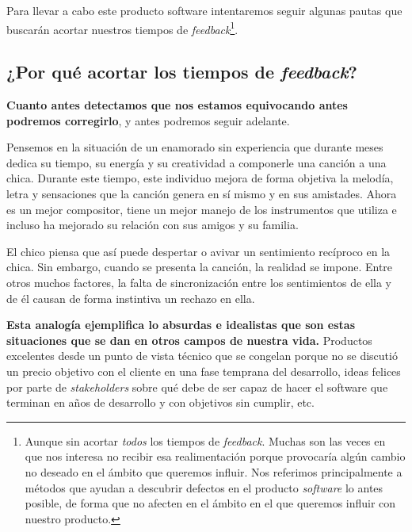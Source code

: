 
Para llevar a cabo este producto software intentaremos seguir algunas
pautas que buscarán acortar nuestros tiempos de \textit{feedback}\footnote{%
    Aunque sin acortar \textit{todos} los tiempos de \textit{feedback}. Muchas son las
    veces en que nos interesa no recibir esa realimentación porque provocaría
    algún cambio no deseado en el ámbito que queremos influir. Nos referimos
    principalmente a métodos que ayudan a descubrir defectos en el producto
    \textit{software} lo antes posible, de forma que no afecten en el ámbito en el que
    queremos influir con nuestro producto.
}.

\subsection{¿Por qué acortar los tiempos de \textit{feedback}?}

\textbf{Cuanto antes detectamos que nos estamos equivocando
antes podremos corregirlo}, y antes podremos seguir adelante.

Pensemos en la situación de un enamorado sin experiencia que durante meses dedica su
tiempo, su energía y su creatividad a componerle una canción a una chica.
Durante este tiempo, este individuo mejora de forma objetiva la
melodía, letra y sensaciones que la canción genera en sí mismo
y en sus amistades. Ahora es un mejor compositor, tiene un mejor manejo
de los instrumentos que utiliza e incluso ha mejorado su
relación con sus amigos y su familia.

El chico piensa que así puede despertar o avivar un sentimiento recíproco
en la chica. Sin embargo, cuando se presenta la canción,
la realidad se impone. Entre otros muchos factores,
la falta de sincronización entre los sentimientos de ella y de él causan
de forma instintiva un rechazo en ella.

\textbf{Esta analogía ejemplifica lo absurdas e idealistas
que son estas situaciones que se dan en otros campos de nuestra vida.}
Productos excelentes desde un punto de vista técnico que se
congelan porque no se discutió un precio objetivo con
el cliente en una fase temprana del desarrollo, ideas felices
por parte de \textit{stakeholders} sobre qué debe de
ser capaz de hacer el software que terminan en años de desarrollo
y con objetivos sin cumplir, etc.

